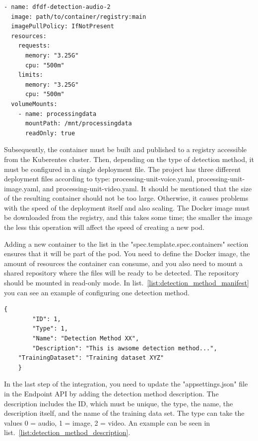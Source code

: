 \begin{lstlisting}[caption={Container configuration in Kubernates manifest},label={list:detection_method_manifest}]
- name: dfdf-detection-audio-2
  image: path/to/container/registry:main
  imagePullPolicy: IfNotPresent
  resources:
    requests:
      memory: "3.25G"
      cpu: "500m"
    limits:
      memory: "3.25G"
      cpu: "500m"
  volumeMounts:
    - name: processingdata
      mountPath: /mnt/processingdata
      readOnly: true
\end{lstlisting}

Subsequently, the container must be built and published to a registry accessible from the Kuberentes cluster. Then, depending on the type of detection method, it must be configured in a single deployment file. The project has three different deployment files according to type: processing-unit-voice.yaml, processing-unit-image.yaml, and processing-unit-video.yaml. It should be mentioned that the size of the resulting container should not be too large. Otherwise, it causes problems with the speed of the deployment itself and also scaling. The Docker image must be downloaded from the registry, and this takes some time; the smaller the image the less this operation will affect the speed of creating a new pod.

Adding a new container to the list in the "spec.template.spec.containers" section ensures that it will be part of the pod. You need to define the Docker image, the amount of resources the container can consume, and you also need to mount a shared repository where the files will be ready to be detected. The repository should be mounted in read-only mode. In list.~\ref{list:detection_method_manifest} you can see an example of configuring one detection method.

\begin{lstlisting}[caption={Detection method description in appsettings.json},label={list:detection_method_description}]
    {
        "ID": 1,
        "Type": 1,
        "Name": "Detection Method XX",
        "Description": "This is awsome detection method...",
    "TrainingDataset": "Training dataset XYZ"
    }
\end{lstlisting}

In the last step of the integration, you need to update the "appsettings.json" file in the Endpoint API by adding the detection method description. The description includes the ID, which must be unique, the type, the name, the description itself, and the name of the training data set. The type can take the values 0 = audio, 1 = image, 2 = video. An example can be seen in list.~\ref{list:detection_method_description}.

